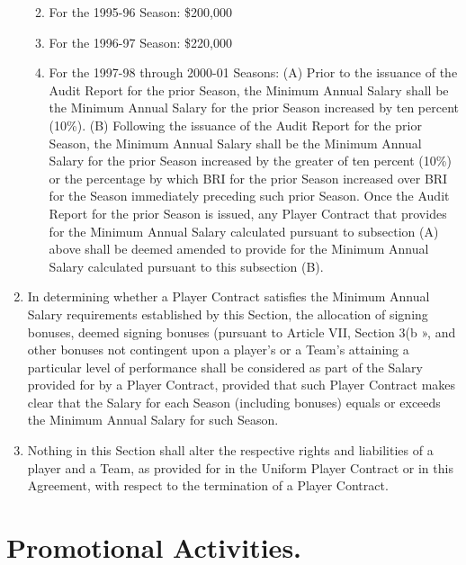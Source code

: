 \documentclass[
]{book}
\providecommand{\tightlist}{%
  \setlength{\itemsep}{0pt}\setlength{\parskip}{0pt}}
\begin{document}
\begin{enumerate}
  \begin{enumerate}
  \def\labelenumii{(\roman{enumii})}
  \tightlist
  \item
    For the 1995-96 Season: \$200,000
  \item
    For the 1996-97 Season: \$220,000
  \item
    For the 1997-98 through 2000-01 Seasons:
    (A) Prior to the issuance of the Audit Report for the prior Season, the Minimum Annual Salary shall be the Minimum Annual Salary for the prior Season increased by ten percent (10\%).
    (B) Following the issuance of the Audit Report for the prior Season, the Minimum Annual Salary shall be the Minimum Annual Salary for the prior Season increased by the greater of ten percent (10\%) or the percentage by which BRI for the prior Season increased over BRI for the Season immediately preceding such prior Season. Once the Audit Report for the prior Season is issued, any Player Contract that provides for the Minimum Annual Salary calculated pursuant to subsection (A) above shall be deemed amended to provide for the Minimum Annual Salary calculated pursuant to this subsection (B).
  \end{enumerate}
\item
  In determining whether a Player Contract satisfies the Minimum Annual Salary requirements established by this Section, the allocation of signing bonuses, deemed signing bonuses (pursuant to Article VII, Section 3(b », and other bonuses not contingent upon a player's or a Team's attaining a particular level of performance shall be considered as part of the Salary provided for by a Player Contract, provided that such Player Contract makes clear that the Salary for each Season (including bonuses) equals or exceeds the Minimum Annual Salary for such Season.
\item
  Nothing in this Section shall alter the respective rights and liabilities of a player and a Team, as provided for in the Uniform Player Contract or in this Agreement, with respect to the termination of a Player Contract.
\end{enumerate}

\hypertarget{promotional-activities.}{%
\section{Promotional Activities.}\label{promotional-activities.}}
\end{document}
